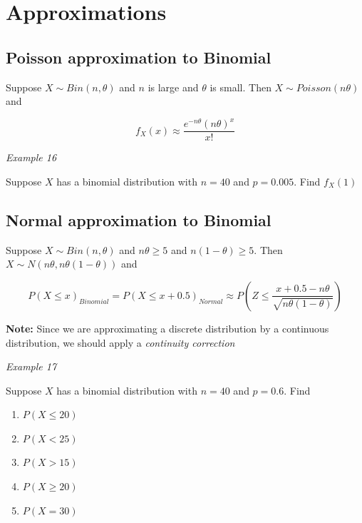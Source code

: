 \documentclass[]{book}
\providecommand{\tightlist}{%
  \setlength{\itemsep}{0pt}\setlength{\parskip}{0pt}}
\begin{document}
\hypertarget{approximations}{%
\section{Approximations}\label{approximations}}

\hypertarget{poisson-approximation-to-binomial}{%
\subsection{Poisson approximation to Binomial}\label{poisson-approximation-to-binomial}}

Suppose \(X\sim Bin(n, \theta)\) and \(n\) is large and \(\theta\) is small. Then \(X\sim Poisson(n\theta)\) and

\[f_X(x) \approx \frac{e^{-n\theta} (n\theta)^x}{x!}\]

\emph{Example 16}

Suppose \(X\) has a binomial distribution with \(n=40\) and \(p=0.005\). Find \(f_X(1)\)

\hypertarget{normal-approximation-to-binomial}{%
\subsection{Normal approximation to Binomial}\label{normal-approximation-to-binomial}}

Suppose \(X\sim Bin(n, \theta)\) and \(n\theta \geq 5\) and \(n(1-\theta) \geq 5.\) Then \(X \sim N(n\theta, n\theta(1-\theta))\) and

\[P(X \leq x)_{Binomial} = P(X \leq x + 0.5)_{Normal} \approx P(Z \leq \frac{x+0.5-n\theta}{\sqrt{n\theta(1-\theta)}})\]

\textbf{Note:} Since we are approximating a discrete distribution by a continuous distribution, we should apply a \emph{continuity correction}

\emph{Example 17}

Suppose \(X\) has a binomial distribution with \(n=40\) and \(p=0.6.\) Find

\begin{enumerate}
\def\labelenumi{\arabic{enumi}.}
\tightlist
\item
  \(P(X\leq 20)\)
\item
  \(P(X < 25)\)
\item
  \(P(X > 15)\)
\item
  \(P(X \geq 20)\)
\item
  \(P(X = 30)\)
\end{enumerate}
\end{document}
